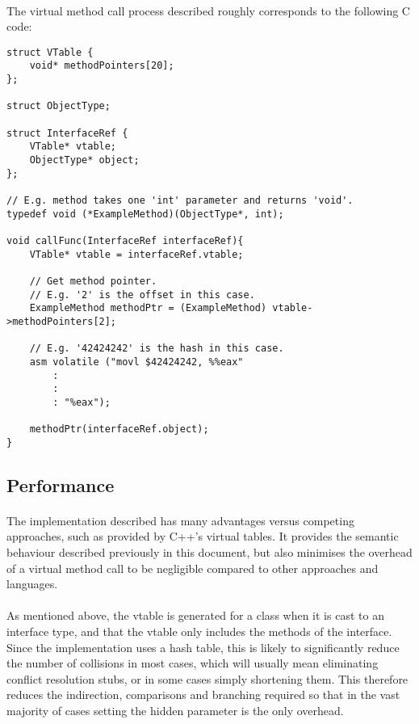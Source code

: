 \documentclass[12pt,twoside,notitlepage]{report}
\begin{document}
\paragraph{}
The virtual method call process described roughly corresponds to the following C code:

\begin{lstlisting}
struct VTable {
	void* methodPointers[20];
};

struct ObjectType;

struct InterfaceRef {
	VTable* vtable;
	ObjectType* object;
};

// E.g. method takes one 'int' parameter and returns 'void'.
typedef void (*ExampleMethod)(ObjectType*, int);

void callFunc(InterfaceRef interfaceRef){
	VTable* vtable = interfaceRef.vtable;	
	
	// Get method pointer.
	// E.g. '2' is the offset in this case.
	ExampleMethod methodPtr = (ExampleMethod) vtable->methodPointers[2];
	
	// E.g. '42424242' is the hash in this case.
	asm volatile ("movl $42424242, %%eax"
		:
		:
		: "%eax");
	
	methodPtr(interfaceRef.object);
}
\end{lstlisting}

\subsection{Performance}

\paragraph{}
The implementation described has many advantages versus competing approaches, such as provided by C++'s virtual tables. It provides the semantic behaviour described previously in this document, but also minimises the overhead of a virtual method call to be negligible compared to other approaches and languages.

\paragraph{}
As mentioned above, the vtable is generated for a class when it is cast to an interface type, and that the vtable only includes the methods of the interface. Since the implementation uses a hash table, this is likely to significantly reduce the number of collisions in most cases, which will usually mean eliminating conflict resolution stubs, or in some cases simply shortening them. This therefore reduces the indirection, comparisons and branching required so that in the vast majority of cases setting the hidden parameter is the only overhead.
\end{document}
